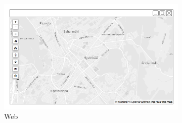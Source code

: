 \begin{figure}[ht]
  \centering
  \begin{subfigure}[b]{0.6\textwidth}
    \includegraphics[width=\textwidth]
      {img/c02-application/png/web-basemap.png}
    \caption{Web}
  \end{subfigure}
  ~
  \begin{subfigure}[b]{0.2\textwidth}

\end{subfigure}
\end{figure}

